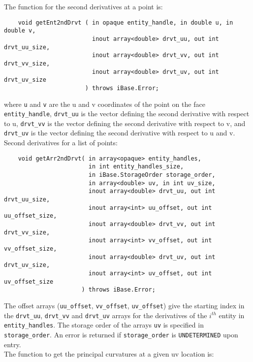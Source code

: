 \documentclass{article}
\begin{document}
\hspace{-16pt}The function for the second derivatives at a point is:

\begin{verbatim}
    void getEnt2ndDrvt ( in opaque entity_handle, in double u, in double v,
                         inout array<double> drvt_uu, out int drvt_uu_size,
                         inout array<double> drvt_vv, out int drvt_vv_size,
                         inout array<double> drvt_uv, out int drvt_uv_size
                       ) throws iBase.Error;
\end{verbatim}
where {\tt u} and {\tt v} are the u and v coordinates of 
the point on the face {\tt entity\_handle}, {\tt drvt\_uu} is 
the vector defining the second derivative with respect to u, {\tt drvt\_vv} is 
the vector defining the second derivative with respect to v, 
and {\tt drvt\_uv} is the vector defining the second 
derivative with respect to u and v.\\

\hspace{-16pt}Second derivatives for a list of points:

\begin{verbatim}
    void getArr2ndDrvt( in array<opaque> entity_handles, 
                        in int entity_handles_size,
                        in iBase.StorageOrder storage_order,
                        in array<double> uv, in int uv_size,
                        inout array<double> drvt_uu, out int drvt_uu_size,
                        inout array<int> uu_offset, out int uu_offset_size,
                        inout array<double> drvt_vv, out int drvt_vv_size,
                        inout array<int> vv_offset, out int vv_offset_size,
                        inout array<double> drvt_uv, out int drvt_uv_size,
                        inout array<int> uv_offset, out int uv_offset_size
                      ) throws iBase.Error;
\end{verbatim}
The offset arrays ({\tt uu\_offset}, {\tt vv\_offset}, {\tt uv\_offset}) give the starting index in the
{\tt drvt\_uu}, {\tt drvt\_vv} and {\tt drvt\_uv} arrays for the
derivatives of the {$i^{th}$} entity in {\tt entity\_handles}.
The storage order of the arrays {\tt uv} is specified in {\tt
  storage\_order}. An error is returned if {\tt storage\_order}
 is {\tt UNDETERMINED} upon entry.\\
 
The function to get the principal curvatures at a given uv 
location is:
\end{document}
